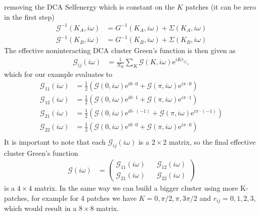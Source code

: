\documentclass[12pt,a4paper]{scrartcl}
\numberwithin{equation}{section}
\begin{document}
removing the DCA Selfenergy which is constant on the $K$ patches (it can be zero in the first step)
\begin{align}
 \mathscr{G}^{-1}(K_A,i\omega) &= G^{-1}(K_A,i\omega) + \Sigma(K_A,i\omega) \\
 \mathscr{G}^{-1}(K_B,i\omega) &= G^{-1}(K_B,i\omega) + \Sigma(K_B,i\omega)
\end{align}
The effective noninteracting DCA cluster Green's function is then given as 
\begin{align}
 \mathscr{G}_{ij}(i\omega) &= \frac{1}{N_K} \sum_K \mathscr{G}(K,i\omega) \mathrm{e}^{iKr_{ij}},
\end{align}
which for our example evaluates to
\begin{align}
 \mathscr{G}_{11}(i\omega) 
 &= \frac{1}{2}\left( \mathscr{G}(0,i\omega) \mathrm{e}^{i0\cdot 0} + \mathscr{G}(\pi,i\omega) \mathrm{e}^{i\pi\cdot 0}\right) \\
  \mathscr{G}_{12}(i\omega) 
 &= \frac{1}{2}\left( \mathscr{G}(0,i\omega) \mathrm{e}^{i0\cdot 1} + \mathscr{G}(\pi,i\omega) \mathrm{e}^{i\pi\cdot 1}\right) \\
  \mathscr{G}_{21}(i\omega) 
 &= \frac{1}{2}\left( \mathscr{G}(0,i\omega) \mathrm{e}^{i0\cdot (-1)} + \mathscr{G}(\pi,i\omega) \mathrm{e}^{i\pi\cdot (-1)}\right) \\
  \mathscr{G}_{22}(i\omega) 
 &= \frac{1}{2}\left( \mathscr{G}(0,i\omega) \mathrm{e}^{i0\cdot 0} + \mathscr{G}(\pi,i\omega) \mathrm{e}^{i\pi\cdot 0}\right) \\
\end{align}
It is important to note that each $\mathscr{G}_{ij}(i\omega) $ is a $2\times 2$ matrix, so the final effective
cluster Green's function
\begin{align}
 \mathscr{G}(i\omega)&=
 \begin{pmatrix}
  \mathscr{G}_{11}(i\omega) && \mathscr{G}_{12}(i\omega) \\
  \mathscr{G}_{21}(i\omega) && \mathscr{G}_{22}(i\omega)
 \end{pmatrix}
\end{align}
is a $4\times 4$ matrix. In the same way we can build a bigger cluster using more K-patches, for example for
4 patches we have $K=0,\pi/2, \pi, 3\pi/2$ and $r_{ij}=0,1,2,3$, which would result in 
a $8\times 8$ matrix.
\end{document}
